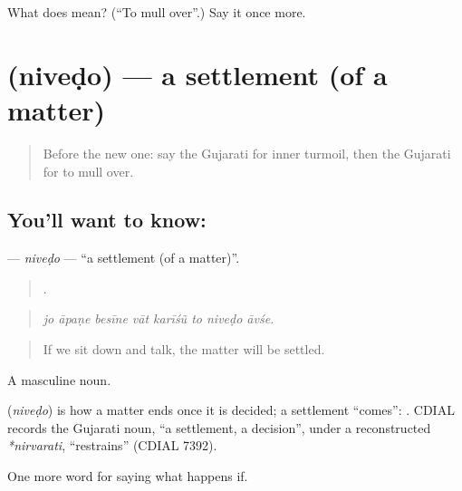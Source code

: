 \begin{tcolorbox}[breakable,colback=teal!4,colframe=teal!35!black,title={Before you move on}]
What does  mean? (\textquotedblleft{}To mull over\textquotedblright{}.) Say it once more.
\end{tcolorbox}
\section[\texorpdfstring{\gu{નિવેડો} (niveḍo)}{નિવેડો (niveḍo)}]{ (niveḍo) — a settlement (of a matter)}

\label{lesson:GU-C538-nivedo}



\begin{quote}
Before the new one: say the Gujarati for inner turmoil, then the Gujarati for to mull over.
\end{quote}

\subsection*{You'll want to know: }
\textbf{} — \emph{niveḍo} — \textquotedblleft{}a settlement (of a matter)\textquotedblright{}.

\begin{quote}
       .
\end{quote}

\begin{quote}
\emph{jo āpaṇe besīne vāt karīśũ to niveḍo āvśe.}
\end{quote}

\begin{quote}
If we sit down and talk, the matter will be settled.
\end{quote}

A masculine noun.

\begin{cousinweb}
\textbf{} (\emph{niveḍo}) is how a matter ends once it is decided; a settlement \textquotedblleft{}comes\textquotedblright{}: \textbf{ }. CDIAL records the Gujarati noun, \textquotedblleft{}a settlement, a decision\textquotedblright{}, under a reconstructed \emph{*nirvarati}, \textquotedblleft{}restrains\textquotedblright{} (CDIAL 7392).
\end{cousinweb}

\begin{grammarlens}[title={What you've built}]
One more word for saying what happens if.
\end{grammarlens}

